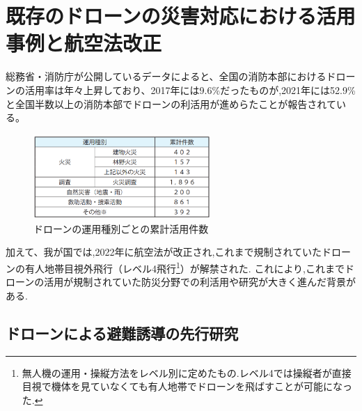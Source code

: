 \section{既存のドローンの災害対応における活用事例と航空法改正}
総務省・消防庁が公開しているデータ\cite{soumusho-01}によると、全国の消防本部におけるドローンの活用率は年々上昇しており、2017年には9.6\%だったものが,2021年には52.9\%と全国半数以上の消防本部でドローンの利活用が進めらたことが報告されている。
\begin{figure}[H] 
  \centering 
  \includegraphics[width=0.6\textwidth]{Figures/2024-11-28 215911.png}
  \caption{ドローンの運用種別ごとの累計活用件数} 
  \label{fig:01} 
\end{figure}

加えて、我が国では,2022年に航空法が改正され,これまで規制されていたドローンの有人地帯目視外飛行（レベル4飛行\footnote{無人機の運用・操縦方法をレベル別に定めたもの.レベル4では操縦者が直接目視で機体を見ていなくても有人地帯でドローンを飛ばすことが可能になった.}）が解禁された.
これにより,これまでドローンの活用が規制されていた防災分野での利活用や研究が大きく進んだ背景がある.\par 
\subsection{ドローンによる避難誘導の先行研究}

